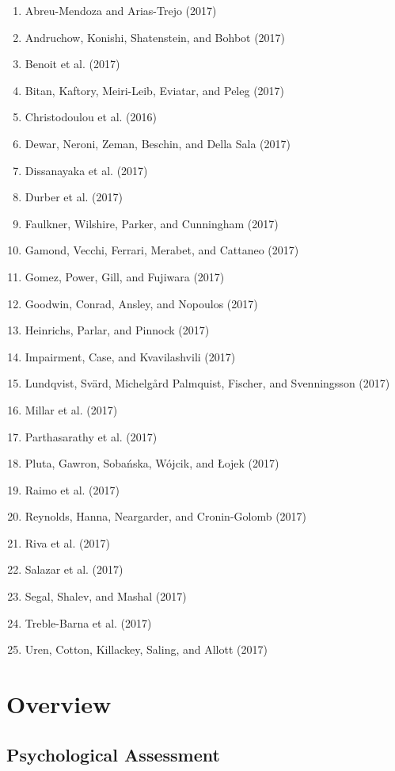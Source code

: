 \documentclass[english,man]{apa6}
\providecommand{\tightlist}{%
  \setlength{\itemsep}{0pt}\setlength{\parskip}{0pt}}
\theoremstyle{definition}
\theoremstyle{definition}
\theoremstyle{definition}
\theoremstyle{remark}
\begin{document}
\begin{enumerate}
\def\labelenumi{\arabic{enumi})}
\tightlist
\item
  Abreu-Mendoza and Arias-Trejo (2017)
\item
  Andruchow, Konishi, Shatenstein, and Bohbot (2017)
\item
  Benoit et al. (2017)
\item
  Bitan, Kaftory, Meiri-Leib, Eviatar, and Peleg (2017)
\item
  Christodoulou et al. (2016)
\item
  Dewar, Neroni, Zeman, Beschin, and Della Sala (2017)
\item
  Dissanayaka et al. (2017)
\item
  Durber et al. (2017)
\item
  Faulkner, Wilshire, Parker, and Cunningham (2017)
\item
  Gamond, Vecchi, Ferrari, Merabet, and Cattaneo (2017)
\item
  Gomez, Power, Gill, and Fujiwara (2017)
\item
  Goodwin, Conrad, Ansley, and Nopoulos (2017)
\item
  Heinrichs, Parlar, and Pinnock (2017)
\item
  Impairment, Case, and Kvavilashvili (2017)
\item
  Lundqvist, Svärd, Michelgård Palmquist, Fischer, and Svenningsson
  (2017)
\item
  Millar et al. (2017)
\item
  Parthasarathy et al. (2017)
\item
  Pluta, Gawron, Sobańska, Wójcik, and Łojek (2017)
\item
  Raimo et al. (2017)
\item
  Reynolds, Hanna, Neargarder, and Cronin-Golomb (2017)
\item
  Riva et al. (2017)
\item
  Salazar et al. (2017)
\item
  Segal, Shalev, and Mashal (2017)
\item
  Treble-Barna et al. (2017)
\item
  Uren, Cotton, Killackey, Saling, and Allott (2017)
\end{enumerate}

\section{Overview}\label{overview}

\subsection{Psychological Assessment}\label{psychological-assessment}
\end{document}
